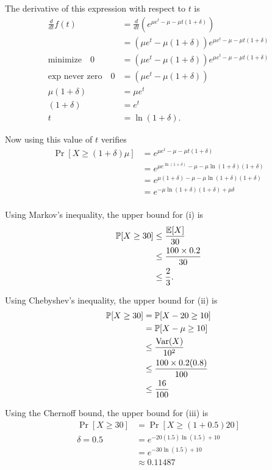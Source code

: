 \documentclass[11pt]{article}
\begin{document}
\begin{solution}
\begin{Parts}
\Part The derivative of this expression with respect to $t$ is
\[
    \begin{split}
        \frac{d}{dt} f(t) &= \frac{d}{dt} \left( e^{\mu e^t - \mu -\mu t (1 + \delta)} \right) \\
        &= (\mu e^t - \mu (1 + \delta))e^{\mu e^t - \mu -\mu t (1 + \delta)} \\
        \text{minimize} \quad 0 &= (\mu e^t - \mu (1 + \delta))e^{\mu e^t - \mu -\mu t (1 + \delta)} \\
        \text{exp never zero} \quad 0 &= (\mu e^t - \mu (1 + \delta)) \\
        \mu (1 + \delta) &= \mu e^t \\
        (1 + \delta) &= e^t \\
        t &= \ln(1 + \delta).
    \end{split}
\]

Now using this value of $t$ verifies
\[
    \begin{split}
        \Pr[X \geq (1+\delta)\mu] &= e^{\mu e^t - \mu -\mu t (1 + \delta)} \\
        &= e^{\mu e^{\ln(1 + \delta)} - \mu -\mu \ln(1 + \delta) (1 + \delta)} \\
        &= e^{\mu (1 + \delta) - \mu -\mu \ln(1 + \delta) (1 + \delta)} \\
        &= e^{-\mu \ln(1 + \delta) (1 + \delta)+\mu \delta} \\
    \end{split}
\]

\Part Using Markov's inequality, the upper bound for (i) is
\[
    \begin{split}
        \operatorname{\mathbb{P}}[X \geq 30] &\leq \frac{\operatorname{\mathbb{E}}[X]}{30} \\
        &\leq \frac{100 \times 0.2}{30} \\
        &\leq \frac{2}{3}.
    \end{split}
\]

Using Chebyshev's inequality, the upper bound for (ii) is 
\[
    \begin{split}
        \operatorname{\mathbb{P}}[X \geq 30] &= \operatorname{\mathbb{P}}[X - 20 \geq 10] \\
        &= \operatorname{\mathbb{P}}[X - \mu \geq 10] \\
        &\leq \frac{\operatorname{Var}(X)}{10^2} \\  
        &\leq \frac{100 \times 0.2(0.8)}{100} \\
        &\leq \frac{16}{100}
    \end{split}
\]

Using the Chernoff bound, the upper bound for (iii) is
\[
    \begin{split}
        \Pr[X \geq 30] &= \Pr[X \geq (1 + 0.5)20] \\
        \text{$\delta = 0.5$} \quad &= e^{-20(1.5) \ln(1.5) + 10} \\
        &= e^{-30 \ln(1.5) + 10} \\
        &\approx 0.11487
    \end{split}
\]


\end{Parts}
\end{solution}
\end{document}
